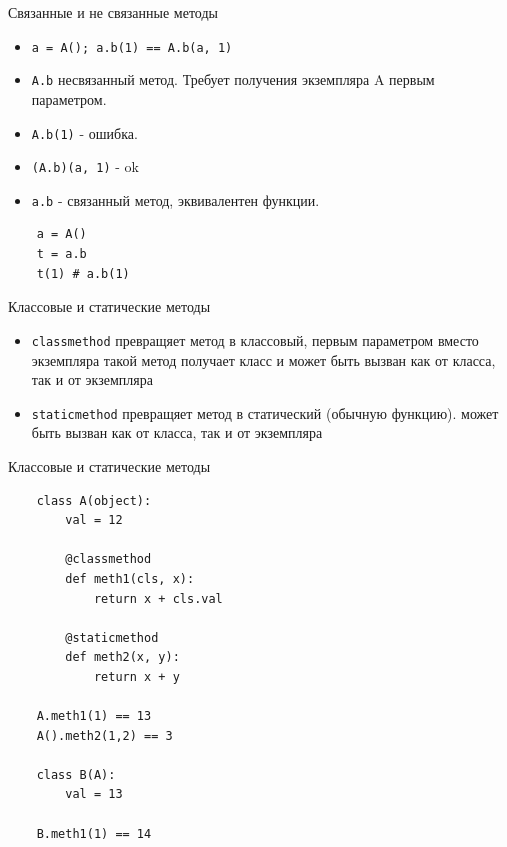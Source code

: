 \documentclass{article}
\begin{document}
\begin{center} Связанные и не связанные методы \end{center}
\begin{itemize}
    \item \lstinline!a = A(); a.b(1) == A.b(a, 1)!
    \item \lstinline!A.b! несвязанный метод. Требует получения экземпляра A первым параметром.
    \item \lstinline!A.b(1)! - ошибка. 
    \item \lstinline!(A.b)(a, 1)! - ok
    \item \lstinline!a.b! - связанный метод, эквивалентен функции.
\end{itemize}
\vspace{15pt}
\begin{lstlisting}
    a = A()
    t = a.b
    t(1) # a.b(1)
\end{lstlisting}
\newpage

\begin{center} Классовые и статические методы \end{center}
\begin{itemize}
    \item \lstinline!classmethod! превращяет метод в классовый, первым параметром вместо
          экземпляра такой метод получает класс и может быть вызван как от класса, 
          так и от экземпляра
    \item \lstinline!staticmethod! превращяет метод в статический (обычную функцию).
          может быть вызван как от класса, 
          так и от экземпляра
\end{itemize}
\newpage

\begin{center} Классовые и статические методы \end{center}
\begin{lstlisting}
    class A(object):
        val = 12

        @classmethod
        def meth1(cls, x):
            return x + cls.val

        @staticmethod
        def meth2(x, y):
            return x + y

    A.meth1(1) == 13
    A().meth2(1,2) == 3 

    class B(A):
        val = 13

    B.meth1(1) == 14
\end{lstlisting}
\newpage
\end{document}

